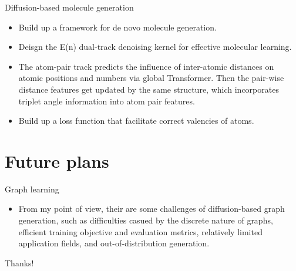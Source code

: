 \documentclass{beamer}
\begin{document}
\begin{frame}{Diffusion-based molecule generation}
    \begin{itemize}
        \item Build up a framework for de novo molecule generation.
        \item Deisgn the E(n) dual-track denoising kernel for effective molecular learning.
        \item The atom-pair track predicts the influence of inter-atomic distances on atomic positions and numbers via global Transformer. Then the pair-wise distance features get updated by the same structure, which incorporates triplet angle information into atom pair features.
        \item Build up a loss function that facilitate correct valencies of atoms.
    \end{itemize}
\end{frame}


\section{Future plans}
\begin{frame}{Graph learning}
    \begin{itemize}
        \item From my point of view, their are some challenges of diffusion-based graph generation, such as difficulties casued by the discrete nature of graphs, efficient training objective and evaluation metrics, relatively limited application fields, and out-of-distribution generation.
    \end{itemize}
\end{frame}

\begin{frame}
    \begin{center}
        {\Huge\calligra Thanks!}
    \end{center}
\end{frame}
\end{document}

